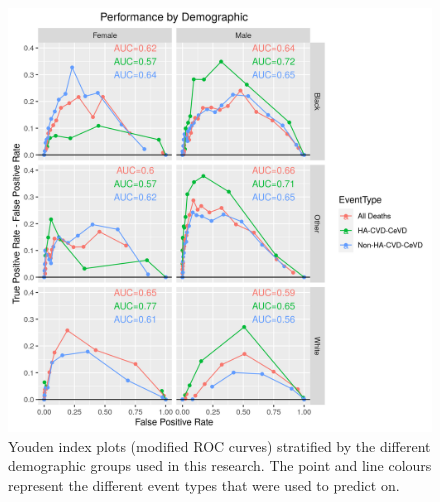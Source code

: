 \documentclass[
]{article}
\begin{document}
\begin{figure}
\centering
\includegraphics{./Rmarkdown_Plots/ROC_CAx-EventType_Demog_10Yr_45-64.png}
\caption{Youden index plots (modified ROC curves) stratified by the different demographic groups used in this research. The point and line colours represent the different event types that were used to predict on.}\label{fig:ROC_Demog}
\end{figure}
\end{document}
